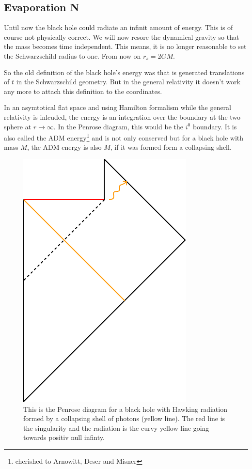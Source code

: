 \subsection{Evaporation N}
	Until now the black hole could radiate an infinit amount of energy. This is of course not physically correct. We will now resore the dynamical gravity so that the mass becomes time independent. This means, it is no longer reasonable to set the Schwarzschild radius to one. From now on $r_s= 2GM$.	
	
	So the old definition of the black hole's energy was that is generated translations of $t$ in the Schwarzschild geometry. But in the general relativity it doesn't work any more to attach this definition to the coordinates.
	
	In an asymtotical flat space and using Hamilton formalism while the general relativity is inlcuded, the energy is an integration over the boundary at the two sphere at $r\rightarrow \infty$. In the Penrose diagram, this would be the $i^0$ boundary. It is also called the ADM energy\footnote{cherished to Arnowitt, Deser and Misner} and is not only conserved but for a black hole with mass $M$, the ADM energy is also $M$, if it was formed form a collapsing shell. 
	
	\begin{figure} [t]
		\begin{center}
			\includegraphics[scale=0.7]{evappen}
			\caption{This is the Penrose diagram for a black hole with Hawking radiation formed by a collapsing shell of photons (yellow line). The red line is the singularity and the radiation is the curvy yellow line going towards positiv null infinty.} \label{penrose_hawking}
		\end{center}
	\end{figure}
		
